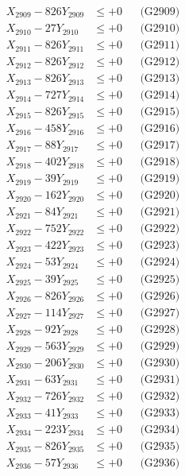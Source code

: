 \documentclass[a4paper,10pt]{article}
\begin{document}
{\begin{align}
X_{2909} - 826Y_{2909} &\leq +0 && \text{(G2909)} \\
X_{2910} - 27Y_{2910} &\leq +0 && \text{(G2910)} \\
\allowbreak
X_{2911} - 826Y_{2911} &\leq +0 && \text{(G2911)} \\
X_{2912} - 826Y_{2912} &\leq +0 && \text{(G2912)} \\
X_{2913} - 826Y_{2913} &\leq +0 && \text{(G2913)} \\
X_{2914} - 727Y_{2914} &\leq +0 && \text{(G2914)} \\
X_{2915} - 826Y_{2915} &\leq +0 && \text{(G2915)} \\
X_{2916} - 458Y_{2916} &\leq +0 && \text{(G2916)} \\
X_{2917} - 88Y_{2917} &\leq +0 && \text{(G2917)} \\
X_{2918} - 402Y_{2918} &\leq +0 && \text{(G2918)} \\
X_{2919} - 39Y_{2919} &\leq +0 && \text{(G2919)} \\
X_{2920} - 162Y_{2920} &\leq +0 && \text{(G2920)} \\
\allowbreak
X_{2921} - 84Y_{2921} &\leq +0 && \text{(G2921)} \\
X_{2922} - 752Y_{2922} &\leq +0 && \text{(G2922)} \\
X_{2923} - 422Y_{2923} &\leq +0 && \text{(G2923)} \\
X_{2924} - 53Y_{2924} &\leq +0 && \text{(G2924)} \\
X_{2925} - 39Y_{2925} &\leq +0 && \text{(G2925)} \\
X_{2926} - 826Y_{2926} &\leq +0 && \text{(G2926)} \\
X_{2927} - 114Y_{2927} &\leq +0 && \text{(G2927)} \\
X_{2928} - 92Y_{2928} &\leq +0 && \text{(G2928)} \\
X_{2929} - 563Y_{2929} &\leq +0 && \text{(G2929)} \\
X_{2930} - 206Y_{2930} &\leq +0 && \text{(G2930)} \\
\allowbreak
X_{2931} - 63Y_{2931} &\leq +0 && \text{(G2931)} \\
X_{2932} - 726Y_{2932} &\leq +0 && \text{(G2932)} \\
X_{2933} - 41Y_{2933} &\leq +0 && \text{(G2933)} \\
X_{2934} - 223Y_{2934} &\leq +0 && \text{(G2934)} \\
X_{2935} - 826Y_{2935} &\leq +0 && \text{(G2935)} \\
X_{2936} - 57Y_{2936} &\leq +0 && \text{(G2936)} \\

\end{align}}
\end{document}
